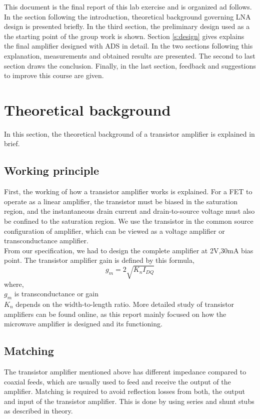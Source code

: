 \documentclass[a4paper, 12pt]{article}
\begin{document}
This document is the final report of this lab exercise and is organized ad follows. 
In the section following the introduction, theoretical background governing LNA design is 
presented briefly. In the third section, the preliminary design used as a the starting 
point of the group work is shown. Section \ref{s:design} gives explains the final amplifier 
designed with ADS in detail. In the two sections following this explanation, measurements 
and obtained results are presented. The second to last section draws the conclusion. 
Finally, in the last section, feedback and suggestions to improve this course are given.

\newpage
\section{Theoretical background}

In this section, the theoretical background of a transistor amplifier is explained in brief.

\subsection{Working principle}
First, the working of how a transistor amplifier works is explained. For a FET to operate
as a linear amplifier, the transistor must be biased in the saturation region, and the instantaneous 
drain current and drain-to-source voltage must also be confined to the saturation region.
We use the transistor in the common source configuration of amplifier, which can be viewed as a voltage
amplifier or transconductance amplifier.\\
From our specification, we had to design the complete amplifier at 2V,30mA bias point. The transistor 
amplifier gain is defined by this formula,$$g_{m} = 2\sqrt{K_n I_{DQ}}$$ where, \\ $g_{m}$ is transconductance or gain \\ $K_{n}$ depends on the width-to-length ratio. 
More detailed study of transistor amplifiers can be found online, as this report mainly focused on 
how the microwave amplifier is designed and its functioning.

\subsection{Matching}
The transistor amplifier mentioned above has different impedance compared to coaxial feeds, which are 
usually used to feed and receive the output of the amplifier. Matching is required to avoid reflection 
losses from both, the output and input of the transistor amplifier. This is done by using series and 
shunt stubs as described in theory.  
\end{document}
